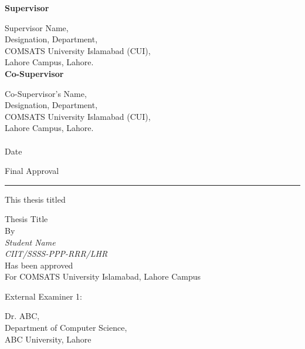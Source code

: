 \begin{titlepage}
\vspace{0.5cm }
\textbf{\large \hspace*{-0.7cm} Supervisor}

\vspace{0.5cm }
\hspace*{-0.7cm} Supervisor Name,\\
Designation, Department,\\
COMSATS University Islamabad (CUI),\\
Lahore Campus, Lahore.\\

\textbf{\large \hspace*{-0.7cm} Co-Supervisor}

\vspace{0.5cm }
\hspace*{-0.7cm} Co-Supervisor's Name,\\
Designation, Department,\\
COMSATS University Islamabad (CUI),\\
Lahore Campus, Lahore.\\\\
Date \\
\begin{center}
\vspace{3.5cm }
\pagebreak


\LARGE Final Approval 
\vspace{5pt}
\hrule
\vspace{0.5cm }
\normalsize  This thesis titled

\LARGE {Thesis Title}\\
\vspace{0.4cm }
\normalsize  By \\
\vspace{0.3cm }
\Large \textit{Student Name}\\
\vspace{0.1cm }
\Large \textit{CIIT/SSSS-PPP-RRR/LHR}\\
\vspace{0.1cm }
\normalsize Has been approved\\
\vspace{0.3cm }
\normalsize For COMSATS University Islamabad, Lahore Campus\\
\end{center}
\vspace{0.3cm }

External Examiner 1: \hrulefill
\begin{center} 
	Dr. ABC,\\
	Department of Computer Science,\\
	ABC University, Lahore
\end{center}


\end{titlepage}
